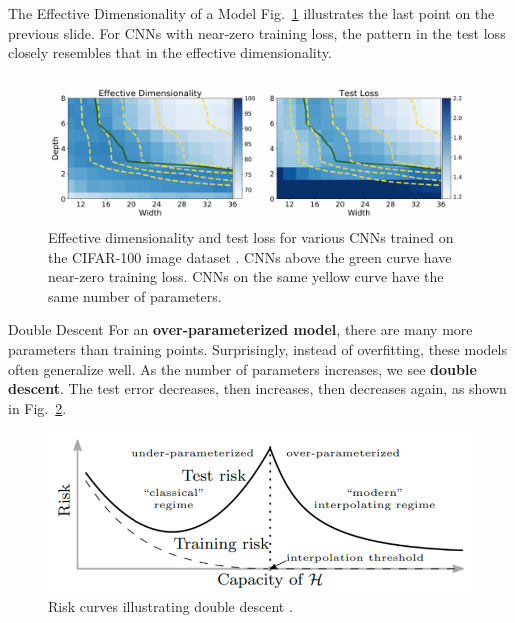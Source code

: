 \documentclass{beamer}
\begin{document}
\begin{frame}{The Effective Dimensionality of a Model}
    Fig.~\ref{fig:effective_dimensionality_and_test_loss} illustrates the last point on the previous slide. For CNNs with near-zero training loss, the pattern in the test loss closely resembles that in the effective dimensionality.
    \begin{figure}
        \centering
        \includegraphics[width=\textwidth]{effective_dimensionality_and_test_loss}
        \caption{Effective dimensionality and test loss for various CNNs trained on the CIFAR-100 image dataset \cite{pml2Book}. CNNs above the green curve have near-zero training loss. CNNs on the same yellow curve have the same number of parameters.}
        \label{fig:effective_dimensionality_and_test_loss}
    \end{figure}    
\end{frame}

\begin{frame}{Double Descent}
    For an \textbf{over-parameterized model}, there are many more parameters than training points. Surprisingly, instead of overfitting, these models often generalize well. As the number of parameters increases, we see \textbf{double descent}. The test error decreases, then increases, then decreases again, as shown in Fig.~\ref{fig:double_descent}.
    
    \begin{figure}
        \centering
        \includegraphics[width=\textwidth]{double_descent}
        \caption{Risk curves illustrating double descent \cite{pml2Book}.}
        \label{fig:double_descent}
    \end{figure}
\end{frame}
\end{document}
